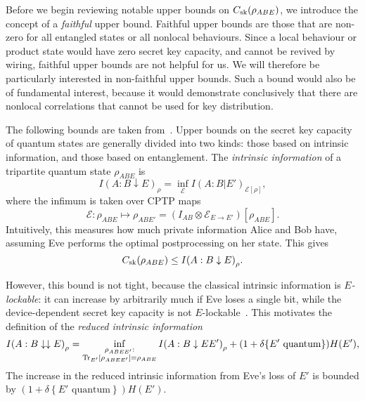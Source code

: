 \documentclass[10pt, a4paper]{article}
\numberwithin{equation}{section} %
\theoremstyle{definition}
\theoremstyle{plain}
\newcommand{\?}{\mathrel{?}} %
\newcommand{\indic}[1]{\delta{\left\{#1\right\}}} %
\newcommand{\Tr}[2][]{\mathop{\mathrm{Tr}#1}\left[ #2 \right]} %
\newcommand{\cE}{\mathcal{E}}
\newcommand{\sk}{\rm sk}
\begin{document}
    Before we begin reviewing notable upper bounds on \(C_{\sk}(\rho_{A B E})\), we introduce the concept of a \emph{faithful} upper bound. Faithful upper bounds are those that are non-zero for all entangled states or all nonlocal behaviours. Since a local behaviour or product state would have zero secret key capacity, and cannot be revived by wiring, faithful upper bounds are not helpful for us. We will therefore be particularly interested in non-faithful upper bounds. Such a bound would also be of fundamental interest, because it would demonstrate conclusively that there are nonlocal correlations that cannot be used for key distribution.

    The following bounds are taken from~\cite{CQKeyDistill}. Upper bounds on the secret key capacity of quantum states are generally divided into two kinds: those based on intrinsic information, and those based on entanglement. The \emph{intrinsic information} of a tripartite quantum state \(\rho_{A B E}\) is
    \begin{equation}
      I{(A : B \downarrow E)}_{\rho} = \inf_{\cE} I{(A : B|E')}_{\cE[\rho]},
    \end{equation}
    where the infimum is taken over CPTP maps 
    \[\cE : \rho_{A B E} \mapsto \rho_{A B E'} = \left(I_{A B} \otimes \cE_{E \to E'}\right)\left[\rho_{A B E}\right]. \] Intuitively, this measures how much private information Alice and Bob have, assuming Eve performs the optimal postprocessing on her state. This gives
    \begin{equation}
      C_{\sk}(\rho_{A B E}) \leq I{(A : B \downarrow E)}_{\rho}.
    \end{equation}

    However, this bound is not tight, because the classical intrinsic information is \emph{\(E\)-lockable}: it can increase by arbitrarily much if Eve loses a single bit, while the device-dependent secret key capacity is not \(E\)-lockable~\cite[Thm 5.1]{CQKeyDistill}. This motivates the definition of the \emph{reduced intrinsic information}
    \begin{equation}\label{eqn:red_intr_info}
      I{(A : B \downarrow\downarrow E)}_{\rho} = \inf_{%
        \substack{\rho_{A B EE'} : \\ 
      \Tr[_{E'}]{\rho_{A B EE'}} = \rho_{A B E}}}
      I{(A : B \downarrow EE')}_{\rho} + (1+\indic{E' \text{ quantum}})H(E'),
    \end{equation}
    The increase in the reduced intrinsic information from Eve's loss of \(E'\) is bounded by \((1+\indic{E' \text{ quantum}})H(E')\).
\end{document}
